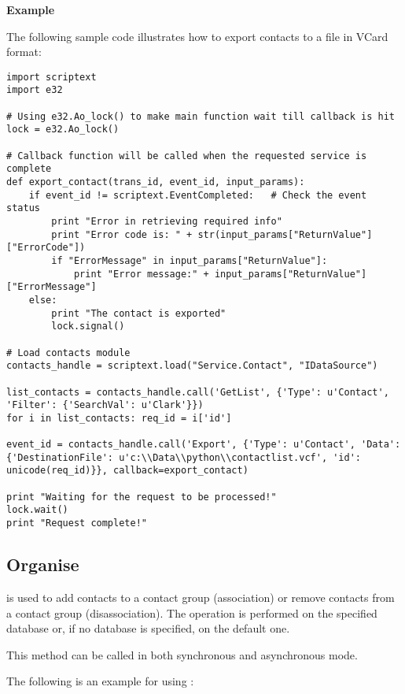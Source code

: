 {\bf Example} \break

The following sample code illustrates how to export contacts to a file in VCard format:

\begin{verbatim}
import scriptext
import e32

# Using e32.Ao_lock() to make main function wait till callback is hit
lock = e32.Ao_lock()

# Callback function will be called when the requested service is complete
def export_contact(trans_id, event_id, input_params):
    if event_id != scriptext.EventCompleted:   # Check the event status
        print "Error in retrieving required info"
        print "Error code is: " + str(input_params["ReturnValue"]["ErrorCode"])
        if "ErrorMessage" in input_params["ReturnValue"]:
            print "Error message:" + input_params["ReturnValue"]["ErrorMessage"]
    else:
        print "The contact is exported"
        lock.signal()

# Load contacts module
contacts_handle = scriptext.load("Service.Contact", "IDataSource")

list_contacts = contacts_handle.call('GetList', {'Type': u'Contact', 'Filter': {'SearchVal': u'Clark'}})
for i in list_contacts: req_id = i['id']

event_id = contacts_handle.call('Export', {'Type': u'Contact', 'Data': {'DestinationFile': u'c:\\Data\\python\\contactlist.vcf', 'id': unicode(req_id)}}, callback=export_contact)

print "Waiting for the request to be processed!"
lock.wait()
print "Request complete!"
\end{verbatim}

\subsection{Organise}
\label{subsec:contactorg}

 is used to add contacts to a contact group (association) or remove contacts from a contact group (disassociation). The operation is performed on the specified database or, if no database is specified, on the default one. \break

This method can be called in both synchronous and asynchronous mode.

The following is an example for using :

